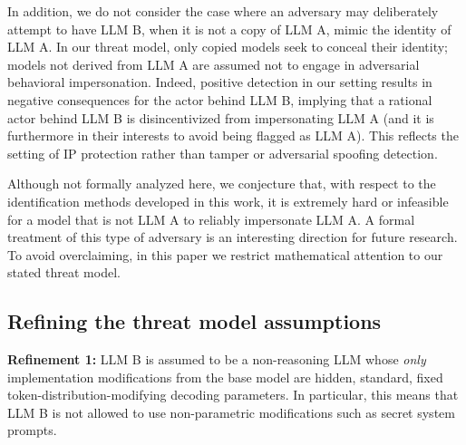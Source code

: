 \documentclass{article}
\begin{document}
In addition, we do not consider the case where an adversary may deliberately attempt to have LLM B, when it is not a copy of LLM A, mimic the identity of LLM A. In our threat model, only copied models seek to conceal their identity; models not derived from LLM A are assumed not to engage in adversarial behavioral impersonation. Indeed, positive detection in our setting results in negative consequences for the actor behind LLM B, implying that a rational actor behind LLM B is disincentivized from impersonating LLM A (and it is furthermore in their interests to avoid being flagged as LLM A). This reflects the setting of IP protection rather than tamper or adversarial spoofing detection.



Although not formally analyzed here, we conjecture that, with respect to the identification methods developed in this work, it is extremely hard or infeasible for a model that is not LLM A to reliably impersonate LLM A. A formal treatment of this type of adversary is an interesting direction for future research. To avoid overclaiming, in this paper we restrict mathematical attention to our stated threat model.



\subsection{Refining the threat model assumptions}

\textbf{Refinement 1:} LLM B is assumed to be a non-reasoning LLM whose \textit{only} implementation modifications from the base model are hidden, standard, fixed token-distribution-modifying decoding parameters. In particular, this means that LLM B is not allowed to use non-parametric modifications such as secret system prompts.
\end{document}
